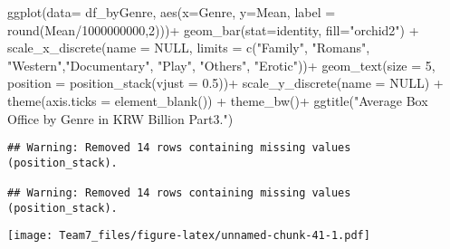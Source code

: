 \documentclass[
]{article}
\newenvironment{Shaded}{\begin{snugshade}}{\end{snugshade}}
\newcommand{\AttributeTok}[1]{\textcolor[rgb]{0.77,0.63,0.00}{#1}}
\newcommand{\ConstantTok}[1]{\textcolor[rgb]{0.00,0.00,0.00}{#1}}
\newcommand{\DecValTok}[1]{\textcolor[rgb]{0.00,0.00,0.81}{#1}}
\newcommand{\FloatTok}[1]{\textcolor[rgb]{0.00,0.00,0.81}{#1}}
\newcommand{\FunctionTok}[1]{\textcolor[rgb]{0.00,0.00,0.00}{#1}}
\newcommand{\NormalTok}[1]{#1}
\newcommand{\OtherTok}[1]{\textcolor[rgb]{0.56,0.35,0.01}{#1}}
\newcommand{\SpecialCharTok}[1]{\textcolor[rgb]{0.00,0.00,0.00}{#1}}
\newcommand{\StringTok}[1]{\textcolor[rgb]{0.31,0.60,0.02}{#1}}
\begin{document}
\begin{Shaded}
\begin{Highlighting}[]
\FunctionTok{ggplot}\NormalTok{(}\AttributeTok{data=}\NormalTok{ df\_byGenre, }\FunctionTok{aes}\NormalTok{(}\AttributeTok{x=}\NormalTok{Genre, }\AttributeTok{y=}\NormalTok{Mean, }
      \AttributeTok{label =} \FunctionTok{round}\NormalTok{(Mean}\SpecialCharTok{/}\DecValTok{1000000000}\NormalTok{,}\DecValTok{2}\NormalTok{)))}\SpecialCharTok{+}
  \FunctionTok{geom\_bar}\NormalTok{(}\AttributeTok{stat=}\StringTok{\textquotesingle{}identity\textquotesingle{}}\NormalTok{, }\AttributeTok{fill=}\StringTok{"orchid2"}\NormalTok{) }\SpecialCharTok{+}
  \FunctionTok{scale\_x\_discrete}\NormalTok{(}\AttributeTok{name =} \ConstantTok{NULL}\NormalTok{, }
                   \AttributeTok{limits =} \FunctionTok{c}\NormalTok{(}\StringTok{"Family"}\NormalTok{, }\StringTok{"Romans"}\NormalTok{, }\StringTok{"Western"}\NormalTok{,}\StringTok{"Documentary"}\NormalTok{, }\StringTok{"Play"}\NormalTok{, }\StringTok{"Others"}\NormalTok{, }\StringTok{"Erotic"}\NormalTok{))}\SpecialCharTok{+}
  \FunctionTok{geom\_text}\NormalTok{(}\AttributeTok{size =} \DecValTok{5}\NormalTok{, }\AttributeTok{position =} \FunctionTok{position\_stack}\NormalTok{(}\AttributeTok{vjust =} \FloatTok{0.5}\NormalTok{))}\SpecialCharTok{+}
  \FunctionTok{scale\_y\_discrete}\NormalTok{(}\AttributeTok{name =} \ConstantTok{NULL}\NormalTok{) }\SpecialCharTok{+}
  \FunctionTok{theme}\NormalTok{(}\AttributeTok{axis.ticks =} \FunctionTok{element\_blank}\NormalTok{()) }\SpecialCharTok{+}
  \FunctionTok{theme\_bw}\NormalTok{()}\SpecialCharTok{+}
  \FunctionTok{ggtitle}\NormalTok{(}\StringTok{"Average Box Office by Genre in KRW Billion Part3."}\NormalTok{)}
\end{Highlighting}
\end{Shaded}

\begin{verbatim}
## Warning: Removed 14 rows containing missing values (position_stack).

## Warning: Removed 14 rows containing missing values (position_stack).
\end{verbatim}

\texttt{[image: Team7\_files/figure-latex/unnamed-chunk-41-1.pdf]}

\begin{Shaded}
\end{Shaded}
\end{document}
